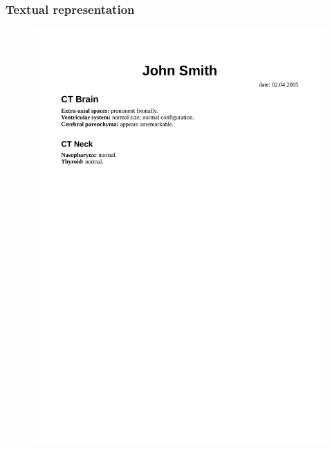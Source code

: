 \documentclass{beamer}
\begin{document}
\begin{frame}
\frametitle{Textual representation}
\begin{figure}
	\centering
	\includegraphics[width=1\linewidth]{../rendered-report}
	\caption{}
	\label{fig:rendered-report}
\end{figure}
\end{frame}
\end{document}
